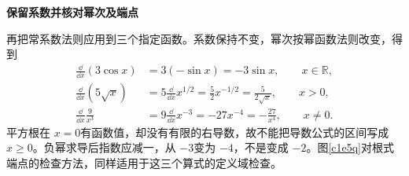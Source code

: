 \begin{solution}
\par\medskip{}\noindent\textbf{保留系数并核对幂次及端点}\par\nobreak
再把常系数法则应用到三个指定函数。系数保持不变，幂次按幂函数法则改变，得到
\begin{align*}
\frac{\dd}{\dd x}(3\cos x)&=3(-\sin x)=-3\sin x,\qquad x\in\mathbb R,\\
\frac{\dd}{\dd x}(5\sqrt x)&=5\frac{\dd}{\dd x}x^{1/2}
 =\frac52x^{-1/2}=\frac5{2\sqrt x},\qquad x>0,\\
\frac{\dd}{\dd x}\frac9{x^3}&=9\frac{\dd}{\dd x}x^{-3}
 =-27x^{-4}=-\frac{27}{x^4},\qquad x\ne0.
\end{align*}
平方根在 $x=0$有函数值，却没有有限的右导数，故不能把导数公式的区间写成 $x\ge0$。负幂求导后指数应减一，从 $-3$变为 $-4$，不是变成 $-2$。图\ref{c1e5q}对根式端点的检查方法，同样适用于这三个算式的定义域检查。
\end{solution}

